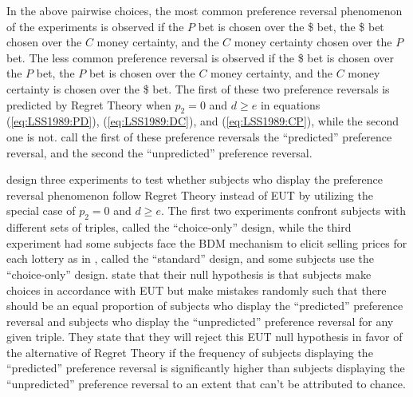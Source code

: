 \documentclass[../main.tex]{subfiles}
\begin{document}
In the above pairwise choices, the most common preference reversal phenomenon of the \textcite{Grether1979} experiments is observed if the $P$ bet is chosen over the {\$} bet, the {\$} bet chosen over the $C$ money certainty, and the $C$ money certainty chosen over the $P$ bet.
The less common preference reversal is observed if the {\$} bet is chosen over the $P$ bet, the $P$ bet is chosen over the $C$ money certainty, and the $C$ money certainty is chosen over the {\$} bet.
The first of these two preference reversals is predicted by Regret Theory when $p_2 =0$ and $d \geq e$ in equations (\ref{eq:LSS1989:PD}), (\ref{eq:LSS1989:DC}), and (\ref{eq:LSS1989:CP}), while the second one is not.
\textcite[143]{Loomes1989} call the first of these preference reversals the \enquote{predicted} preference reversal, and the second the \enquote{unpredicted} preference reversal.

\textcite{Loomes1989} design three experiments to test whether subjects who display the preference reversal phenomenon follow Regret Theory instead of EUT by utilizing the special case of $p_2 = 0$ and $d \geq e$.
The first two experiments confront subjects with different sets of triples, called the \enquote{choice-only} design, while the third experiment had some subjects face the BDM mechanism to elicit selling prices for each lottery as in \textcite{Grether1979}, called the \enquote{standard} design, and some subjects use the \enquote{choice-only} design.
\textcite[142]{Loomes1989} state that their null hypothesis is that subjects make choices in accordance with EUT but make mistakes randomly such that there should be an equal proportion of subjects who display the \enquote{predicted} preference reversal and subjects who display the \enquote{unpredicted} preference reversal for any given triple.
They state that they will reject this EUT null hypothesis in favor of the alternative of Regret Theory if the frequency of subjects displaying the \enquote{predicted} preference reversal is significantly higher than subjects displaying the \enquote{unpredicted} preference reversal to an extent that can't be attributed to chance.
\end{document}
